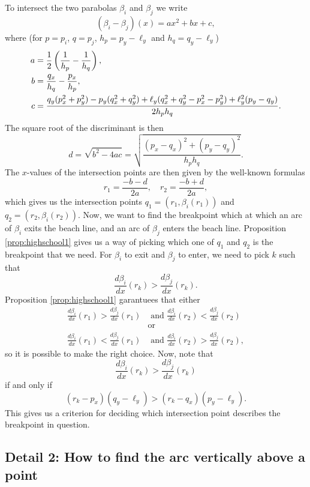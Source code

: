 To intersect the two parabolas $\beta_i$ and $\beta_j$ we write
\[
    (\beta_i - \beta_j)(x) = a x^2 + b x + c,
\]
where (for $p = p_i$, $q = p_j$, $h_p = p_y - \ell_y$ and $h_q = q_y - \ell_y$)
\begin{align*}
    a &= \frac{1}{2} \left(\frac{1}{h_p} - \frac{1}{h_q}\right), \\
    b &= \frac{q_x}{h_q} - \frac{p_x}{h_p}, \\
    c &= \frac{q_y(p_x^2 + p_y^2) - p_y (q_x^2 + q_y^2) + \ell_y (q_x^2 + q_y^2 - p_x^2 - p_y^2) + \ell_y^2 (p_y - q_y)}{2 h_p h_q}.
\end{align*}
The square root of the discriminant is then
\[
    d = \sqrt{b^2 - 4 ac} = \sqrt{\frac{(p_x - q_x)^2 + (p_y - q_y)^2}{h_p h_q}}.
\]
The $x$-values of the intersection points are then given by the well-known formulas
\[
    r_1 = \frac{-b - d}{2 a}, \quad
    r_2 = \frac{-b + d}{2 a},
\]
which gives us the intersection points $q_1 = (r_1, \beta_i(r_1))$ and $q_2 = (r_2, \beta_i(r_2))$. Now, we want to find the breakpoint which at which an arc of $\beta_i$ exits the beach line, and an arc of $\beta_j$ enters the beach line. Proposition \ref{prop:highschool1} gives us a way of picking which one of $q_1$ and $q_2$ is the breakpoint that we need. For $\beta_i$ to exit and $\beta_j$ to enter, we need to pick $k$ such that
\[
    \frac{d \beta_i}{dx}(r_k) > \frac{d \beta_j}{dx}(r_k).
\]
 Proposition \ref{prop:highschool1} garantuees that either
\begin{align*}
    \frac{d \beta_i}{dx}(r_1) > \frac{d \beta_j}{dx}(r_1) &\text{ and } \frac{d \beta_i}{dx}(r_2) < \frac{d \beta_j}{dx}(r_2) \\
    &\text{or} \\
    \frac{d \beta_i}{dx}(r_1) < \frac{d \beta_j}{dx}(r_1) &\text{ and } \frac{d \beta_i}{dx}(r_2) > \frac{d \beta_j}{dx}(r_2),
\end{align*}
so it is possible to make the right choice. Now, note that
\[
    \frac{d \beta_i}{dx}(r_k) > \frac{d \beta_j}{dx}(r_k)
\]
if and only if
\[
    (r_k - p_x) (q_y - \ell_y) > (r_k - q_x) (p_y - \ell_y).
\]
This gives us a criterion for deciding which intersection point describes the breakpoint in question.

\subsection*{Detail 2: How to find the arc vertically above a point}
